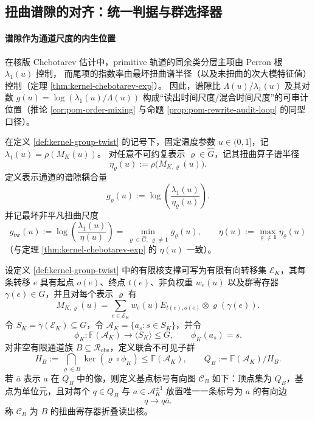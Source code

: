 \subsection{扭曲谱隙的对齐：统一判据与群选择器}\label{subsec:group-unification-spectral-alignment}

\paragraph{谱隙作为通道尺度的内生位置}
在核版 Chebotarev 估计中，primitive 轨道的同余类分层主项由 Perron 根 \(\lambda_1(u)\) 控制，
而尾项的指数率由最坏扭曲谱半径（以及未扭曲的次大模特征值）控制（定理 \ref{thm:kernel-chebotarev-exp}）。
因此，谱隙比 \(\Lambda(u)/\lambda_1(u)\) 及其对数
\(
g(u)=\log(\lambda_1(u)/\Lambda(u))
\)
构成“读出时间尺度/混合时间尺度”的可审计位置（推论 \ref{cor:pom-order-mixing} 与命题 \ref{prop:pom-rewrite-audit-loop} 的同型口径）。

\begin{definition}\label{def:spec-coupling}
在定义 \ref{def:kernel-group-twist} 的记号下，固定温度参数 \(u\in(0,1]\)，记 \(\lambda_1(u)=\rho(M_K(u))\)。
对任意不可约复表示 \(\varrho\in\widehat G\)，记其扭曲算子谱半径
\[
\eta_{\varrho}(u):=\rho\!\bigl(M_{K,\varrho}(u)\bigr).
\]
定义表示通道的谱隙耦合量
\[
g_{\varrho}(u):=\log\!\left(\frac{\lambda_1(u)}{\eta_{\varrho}(u)}\right).
\]
并记最坏非平凡扭曲尺度
\[
g_{\mathrm{tw}}(u):=\log\!\left(\frac{\lambda_1(u)}{\eta(u)}\right)
=\min_{\varrho\in\widehat G,\ \varrho\ne \mathbf{1}} g_{\varrho}(u),
\qquad
\eta(u):=\max_{\varrho\ne\mathbf{1}}\eta_{\varrho}(u)
\]
（与定理 \ref{thm:kernel-chebotarev-exp} 的 \(\eta(u)\) 一致）。
\end{definition}
\begin{definition}[扭曲寄存器的折叠读出核]\label{distill:stallings_foldings_and_bestvina_handel_train_tracks-subgroup_reconstruction_from_canonical_finite_automata-core-def}
设定义 \ref{def:kernel-group-twist} 中的有限核支撑可写为有限有向转移集 \(\mathcal E_K\)，其每条转移 \(e\) 具有起点 \(o(e)\)、终点 \(t(e)\)、非负权重 \(w_e(u)\) 以及群寄存器 \(\gamma(e)\in G\)，并且对每个表示 \(\varrho\) 有
\[
M_{K,\varrho}(u)=\sum_{e\in\mathcal E_K}w_e(u)E_{t(e),o(e)}\otimes \varrho(\gamma(e)).
\]
令 \(S_K=\gamma(\mathcal E_K)\subseteq G\)，令 \(\mathcal A_K=\{a_s:s\in S_K\}\)，并令
\[
\phi_K:\mathbb F(\mathcal A_K)\longrightarrow \langle S_K\rangle\leq G,
\qquad \phi_K(a_s)=s.
\]
对非空有限通道族 \(B\subseteq\mathcal R_{\mathrm{obs}}\)，定义联合不可见子群
\[
H_B:=\bigcap_{\varrho\in B}\ker(\varrho\circ\phi_K)\leq \mathbb F(\mathcal A_K),
\qquad Q_B:=\mathbb F(\mathcal A_K)/H_B.
\]
若 \(\bar a\) 表示 \(a\) 在 \(Q_B\) 中的像，则定义基点标号有向图 \(\mathscr C_B\) 如下：顶点集为 \(Q_B\)，基点为单位元，且对每个 \(q\in Q_B\) 与 \(a\in\mathcal A_K^{\pm1}\) 放置唯一一条标号为 \(a\) 的有向边
\[
q\longrightarrow q\bar a .
\]
称 \(\mathscr C_B\) 为 \(B\) 的扭曲寄存器折叠读出核。
\end{definition}

